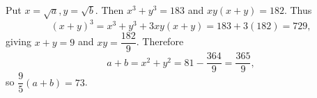Put $x=\sqrt a,y=\sqrt b$. Then $x^3+y^3=183$ and $xy(x+y)=182$. Thus
\[(x+y)^3=x^3+y^3+3xy(x+y)=183+3(182)=729,\]
giving $x+y=9$ and $xy=\dfrac{182}{9}$. Therefore
\[a+b=x^2+y^2=81-\dfrac{364}{9}=\dfrac{365}{9},\]
so $\dfrac{9}{5}(a+b)=\boxed{73}$.
